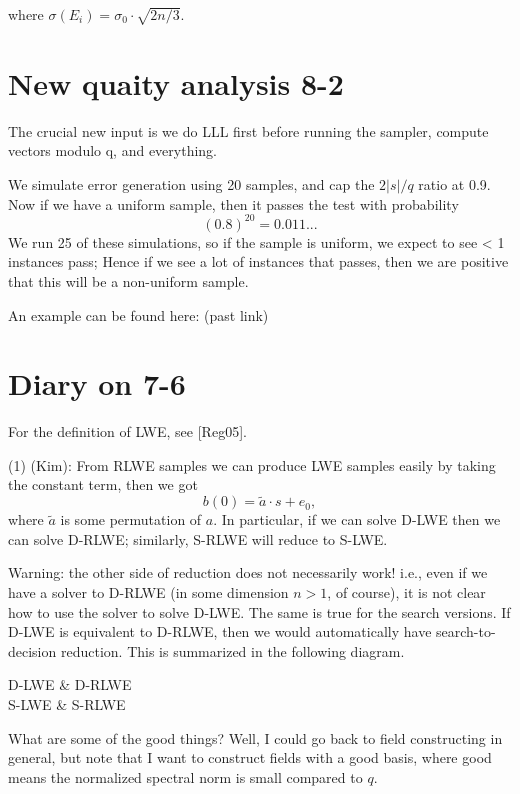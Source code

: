 \documentclass{amsart}
\begin{document}
where $\sigma(E_i) = \sigma_0 \cdot \sqrt{2n/3}$.


\newpage

\section{New quaity analysis 8-2}

The crucial new input is we do LLL first before running
the sampler, compute vectors modulo q, and everything.

We simulate error generation using 20 samples, and
cap the $2|s|/q$ ratio at 0.9. Now if we have a uniform
sample, then it passes the test with probability
\[
        (0.8)^20 = 0.011...
\]
We run 25 of these simulations, so if the sample is uniform, we expect to see < 1 instances pass; Hence if
we see a lot of instances that passes, then we are positive that this will be a non-uniform sample.

An example can be found here: (past link)




\section{Diary on 7-6}

For the definition of LWE, see [Reg05].

(1) (Kim): From RLWE samples we can produce LWE samples easily by taking the constant term, then we got
\[
    b(0) = \tilde{a} \cdot s  + e_0,
\]
where $\tilde{a}$ is some permutation of $a$. In particular,
if we can solve D-LWE then we can solve D-RLWE; similarly,
S-RLWE will reduce to S-LWE.

Warning: the other side of reduction does not necessarily work! i.e., even if we have a solver to D-RLWE (in some dimension $n > 1$, of course), it is not clear how to use the solver to solve D-LWE. The same is true for the search versions. If D-LWE is equivalent to D-RLWE, then we would automatically have search-to-decision reduction. This is summarized in the following diagram.

\begin{cd}
D-LWE \arrow[r, Rightarrow] \arrow[d, "Reg05"] & D-RLWE  \\
S-LWE \arrow[r,Rightarrow] & S-RLWE
\end{cd}

What are some of the good things? Well, I could go back to field constructing in general, but note that I want to
construct fields with a good basis, where good means the normalized spectral norm is small compared to $q$.
\end{document}
